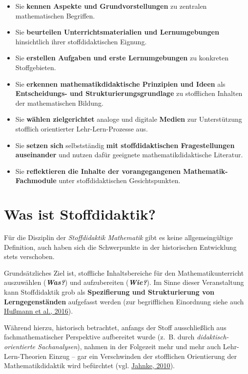 \documentclass[
]{scrbook}
\providecommand{\tightlist}{%
  \setlength{\itemsep}{0pt}\setlength{\parskip}{0pt}}
\theoremstyle{definition}
\theoremstyle{definition}
\theoremstyle{definition}
\theoremstyle{definition}
\theoremstyle{remark}
\begin{document}
\begin{itemize}
\tightlist
\item
  Sie \textbf{kennen Aspekte und Grundvorstellungen} zu zentralen mathematischen Begriffen.
\item
  Sie \textbf{beurteilen Unterrichtsmaterialien und Lernumgebungen} hinsichtlich ihrer stoffdidaktischen Eignung.
\item
  Sie \textbf{erstellen Aufgaben und erste Lernumgebungen} zu konkreten Stoffgebieten.
\item
  Sie \textbf{erkennen mathematikdidaktische Prinzipien und Ideen} als \textbf{Entscheidungs- und Strukturierungsgrundlage} zu stofflichen Inhalten der mathematischen Bildung.
\item
  Sie \textbf{wählen zielgerichtet} analoge und digitale \textbf{Medien} zur Unterstützung stofflich orientierter Lehr-Lern-Prozesse aus.
\item
  Sie \textbf{setzen sich} selbstständig \textbf{mit stoffdidaktischen Fragestellungen auseinander} und nutzen dafür geeignete mathematikdidaktische Literatur.
\item
  Sie \textbf{reflektieren die Inhalte der vorangegangenen Mathematik-Fachmodule} unter stoffdidaktischen Gesichtspunkten.
\end{itemize}

\hypertarget{was-ist-stoffdidaktik}{%
\section*{Was ist Stoffdidaktik?}\label{was-ist-stoffdidaktik}}

Für die Disziplin der \emph{Stoffdidaktik Mathematik} gibt es keine allgemeingültige Definition, auch haben sich die Schwerpunkte in der historischen Entwicklung stets verschoben.

Grundsätzliches Ziel ist, stoffliche Inhaltsbereiche für den Mathematikunterricht auszuwählen (\textbf{\emph{Was?}}) und aufzubereiten (\textbf{\emph{Wie?}}). Im Sinne dieser Veranstaltung kann Stoffdidaktik grob als \textbf{Spezifierung und Strukturierung von Lerngegenständen} aufgefasst werden (zur begrifflichen Einordnung siehe auch \protect\hyperlink{ref-Hussmann:2016a}{Hußmann et al., 2016}).

Während hierzu, historisch betrachtet, anfangs der Stoff ausschließlich aus fachmathematischer Perspektive aufbereitet wurde (z.~B. durch \emph{didaktisch-orientierte Sachanalysen}), nahmen in der Folgezeit mehr und mehr auch Lehr-Lern-Theorien Einzug -- gar ein Verschwinden der stofflichen Orientierung der Mathematikdidaktik wird befürchtet (vgl. \protect\hyperlink{ref-Jahnke:2010}{Jahnke, 2010}).
\end{document}
